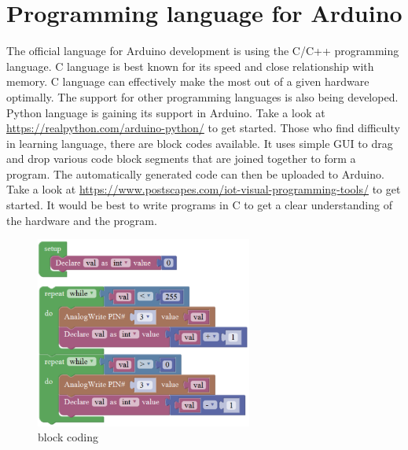 \section{Programming language for Arduino}
The official language for Arduino development is using the C/C++ programming language. C language is best known for its speed and close relationship with memory. C language can effectively make the most out of a given hardware optimally. The support for other programming languages is also being developed. Python language is gaining its support in Arduino. Take a look at \url{https://realpython.com/arduino-python/} to get started. Those who find difficulty in learning language, there are block codes available. It uses simple GUI to drag and drop various code block segments that are joined together to form a program. The automatically generated code can then be uploaded to Arduino. Take a look at \url{https://www.postscapes.com/iot-visual-programming-tools/} to get started. It would be best to write programs in C to get a clear understanding of the hardware and the program.

\begin{figure}
    \centering
    \includegraphics[width=2.8in]{Images/Programing_Arduino/block_code.png}
    \caption{block coding}
\end{figure}

\pagebreak
